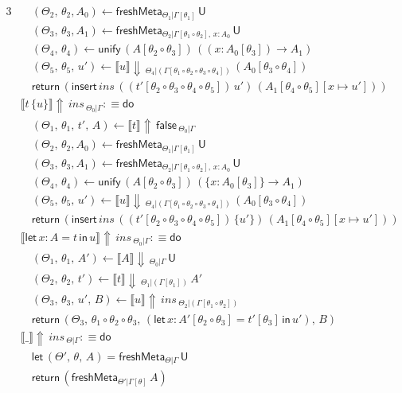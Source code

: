 \documentclass[acmsmall,review,anonymous,prologue,dvipsnames]{acmart}\settopmatter{printfolios=true,printccs=false,printacmref=false}
\newcommand{\slet}{\boldsymbol{\mathsf{let}}}
\renewcommand{\sin}{\boldsymbol{\mathsf{in}}}
\renewcommand{\U}{\mathsf{U}}
\newcommand{\freshMeta}[3]{\mathsf{freshMeta}_{#1|#2}\,#3}
\newcommand{\unify}{\mathsf{unify}}
\newcommand{\echeck}[4]{\llbracket#1\rrbracket\!\Downarrow\,_{#2|#3}\,#4}
\newcommand{\einfer}[4]{\llbracket#1\rrbracket\!\Uparrow\,#2\,_{#3|#4}}
\newcommand{\edo}{\boldsymbol{\mathsf{do}}}
\newcommand{\ereturn}{\boldsymbol{\mathsf{return}}}
\newcommand{\false}{\mathsf{false}}
\theoremstyle{remark}
\begin{document}
\begin{alignat*}{3}
  &\quad (\Theta_2,\,\theta_2,A_0) \leftarrow \freshMeta{\Theta_1}{\Gamma[\theta_1]}{\U}\\
  &\quad (\Theta_3,\,\theta_3,A_1) \leftarrow \freshMeta{\Theta_2}{\Gamma[\theta_1\circ\theta_2],\,x:A_0}{\U}\\
  &\quad (\Theta_4,\,\theta_4) \leftarrow \unify\,(A[\theta_2\circ\theta_3])\,((x : A_0[\theta_3])\to A_1)\\
  &\quad (\Theta_5,\,\theta_5,\,u') \leftarrow \echeck{u}{\Theta_4}{(\Gamma[\theta_1\circ\theta_2\circ\theta_3\circ\theta_4])}{(A_0[\theta_3\circ\theta_4])}\\
  &\quad \ereturn\,(\mathsf{insert}\,{ins}\,{((t'[\theta_2\circ\theta_3\circ\theta_4\circ\theta_5])\,u')}\,{(A_1[\theta_4\circ\theta_5][x\mapsto u'])})\\
  &\einfer{t\,\{u\}}{ins}{\Theta_0}{\Gamma} :\equiv \edo \\
  &\quad (\Theta_1,\,\theta_1,\,t',\,A) \leftarrow \einfer{t}{\false}{\Theta_0}{\Gamma}\\
  &\quad (\Theta_2,\,\theta_2,A_0) \leftarrow \freshMeta{\Theta_1}{\Gamma[\theta_1]}{\U}\\
  &\quad (\Theta_3,\,\theta_3,A_1) \leftarrow \freshMeta{\Theta_2}{\Gamma[\theta_1\circ\theta_2],\,x:A_0}{\U}\\
  &\quad (\Theta_4,\,\theta_4) \leftarrow \unify\,(A[\theta_2\circ\theta_3])\,(\{x : A_0[\theta_3]\}\to A_1)\\
  &\quad (\Theta_5,\,\theta_5,\,u') \leftarrow \echeck{u}{\Theta_4}{(\Gamma[\theta_1\circ\theta_2\circ\theta_3\circ\theta_4])}{(A_0[\theta_3\circ\theta_4])}\\
  &\quad \ereturn\,(\mathsf{insert}\,{ins}\,{((t'[\theta_2\circ\theta_3\circ\theta_4\circ\theta_5])\,\{u'\})}\,{(A_1[\theta_4\circ\theta_5][x\mapsto u'])})\\
  &\einfer{\slet\,x:A=t\,\sin\,u}{ins}{\Theta_0}{\Gamma} :\equiv \edo \\
  &\quad(\Theta_1,\,\theta_1,\,A') \leftarrow \echeck{A}{\Theta_0}{\Gamma}{\U}\\
  &\quad(\Theta_2,\,\theta_2,\,t') \leftarrow \echeck{t}
                {\Theta_1}{(\Gamma[\theta_1])}{A'}\\
  &\quad(\Theta_3,\,\theta_3,\,u',\,B) \leftarrow
                \einfer{u}{ins}{\Theta_2}{(\Gamma[\theta_1\circ\theta_2])}\\
  &\quad\ereturn\,(\Theta_3,\,\theta_1\circ\theta_2\circ\theta_3,\,(\slet\,x:A'[\theta_2\circ\theta_3]=t'[\theta_3]\,\sin\,u'),\,B)\\
  &\einfer{\_}{ins}{\Theta}{\Gamma} :\equiv \edo \\
  &\quad \slet\,(\Theta',\,\theta,\,A) = \freshMeta{\Theta}{\Gamma}{\U}\\
  &\quad \ereturn\,(\freshMeta{\Theta'}{\Gamma[\theta]}{A})\\
\end{alignat*}
\endgroup
\end{document}
